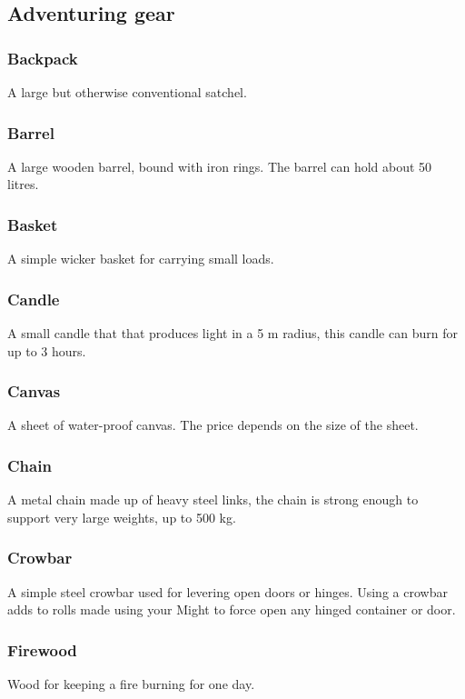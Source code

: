 \documentclass[a4paper,11pt,oneside]{book}
\newcommand{\textlf}[1]{\textbf{\titlecap{#1}}}
\begin{document}
\subsection{Adventuring gear}

\subsubsection*{Backpack}
A large but otherwise conventional satchel.

\subsubsection*{Barrel}
A large wooden barrel, bound with iron rings. The barrel can hold about 50 litres.

\subsubsection*{Basket}
A simple wicker basket for carrying small loads.

\subsubsection*{Candle}
A small candle that that produces \textlf{low} light in a 5 m radius, this candle can burn for up to 3 hours.

\subsubsection*{Canvas}
A sheet of water-proof canvas. The price depends on the size of the sheet.

\subsubsection*{Chain}
A metal chain made up of heavy steel links, the chain is strong enough to support very large weights, up to 500 kg.

\subsubsection*{Crowbar}
A simple steel crowbar used for levering open doors or hinges. Using a crowbar adds \textlf{edge+} to rolls made using your Might to force open any hinged container or door.

\subsubsection*{Firewood}
Wood for keeping a fire burning for one day.
\end{document}
